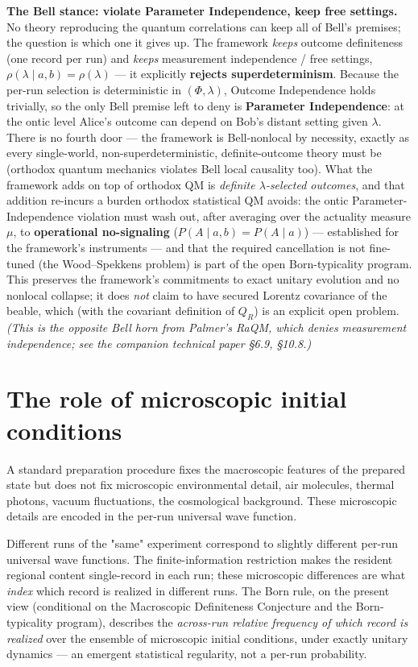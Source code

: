 \documentclass[11pt,a4paper]{article}
\begin{document}
\textbf{The Bell stance: violate Parameter Independence, keep free settings.} No theory reproducing the quantum correlations can keep all of Bell's premises; the question is which one it gives up. The framework \emph{keeps} outcome definiteness (one record per run) and \emph{keeps} measurement independence / free settings, $\rho(\lambda \mid a,b) = \rho(\lambda)$ — it explicitly \textbf{rejects superdeterminism}. Because the per-run selection is deterministic in $(\Phi,\lambda)$, Outcome Independence holds trivially, so the only Bell premise left to deny is \textbf{Parameter Independence}: at the ontic level Alice's outcome can depend on Bob's distant setting given $\lambda$. There is no fourth door — the framework is Bell-nonlocal by necessity, exactly as every single-world, non-superdeterministic, definite-outcome theory must be (orthodox quantum mechanics violates Bell local causality too). What the framework adds on top of orthodox QM is \emph{definite $\lambda$-selected outcomes}, and that addition re-incurs a burden orthodox statistical QM avoids: the ontic Parameter-Independence violation must wash out, after averaging over the actuality measure $\mu$, to \textbf{operational no-signaling} ($P(A\mid a,b)=P(A\mid a)$) — established for the framework's instruments — and that the required cancellation is not fine-tuned (the Wood–Spekkens problem) is part of the open Born-typicality program. This preserves the framework's commitments to exact unitary evolution and no nonlocal collapse; it does \emph{not} claim to have secured Lorentz covariance of the beable, which (with the covariant definition of $Q_R$) is an explicit open problem. \emph{(This is the opposite Bell horn from Palmer's RaQM, which denies measurement independence; see the companion technical paper §6.9, §10.8.)}

\section{The role of microscopic initial conditions}

A standard preparation procedure fixes the macroscopic features of the prepared state but does not fix microscopic environmental detail, air molecules, thermal photons, vacuum fluctuations, the cosmological background. These microscopic details are encoded in the per-run universal wave function.

Different runs of the "same" experiment correspond to slightly different per-run universal wave functions. The finite-information restriction makes the resident regional content single-record in each run; these microscopic differences are what \emph{index} which record is realized in different runs. The Born rule, on the present view (conditional on the Macroscopic Definiteness Conjecture and the Born-typicality program), describes the \emph{across-run relative frequency of which record is realized} over the ensemble of microscopic initial conditions, under exactly unitary dynamics — an emergent statistical regularity, not a per-run probability.
\end{document}
